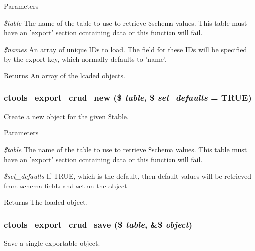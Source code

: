\begin{DoxyParams}{Parameters}
\item[{\em \$table}]The name of the table to use to retrieve \$schema values. This table must have an 'export' section containing data or this function will fail. \item[{\em \$names}]An array of unique IDs to load. The field for these IDs will be specified by the export key, which normally defaults to 'name'.\end{DoxyParams}
\begin{DoxyReturn}{Returns}
An array of the loaded objects. 
\end{DoxyReturn}
\hypertarget{group__export__crud_gafa3d98363b3c0cd3aa90d2d4e9215fbc}{
\subsubsection[{ctools\_\-export\_\-crud\_\-new}]{\setlength{\rightskip}{0pt plus 5cm}ctools\_\-export\_\-crud\_\-new (\$ {\em table}, \/  \$ {\em set\_\-defaults} = {\ttfamily TRUE})}}
\label{group__export__crud_gafa3d98363b3c0cd3aa90d2d4e9215fbc}
Create a new object for the given \$table.


\begin{DoxyParams}{Parameters}
\item[{\em \$table}]The name of the table to use to retrieve \$schema values. This table must have an 'export' section containing data or this function will fail. \item[{\em \$set\_\-defaults}]If TRUE, which is the default, then default values will be retrieved from schema fields and set on the object.\end{DoxyParams}
\begin{DoxyReturn}{Returns}
The loaded object. 
\end{DoxyReturn}
\hypertarget{group__export__crud_ga026370fc39c98bb82c70f223642044cf}{
\subsubsection[{ctools\_\-export\_\-crud\_\-save}]{\setlength{\rightskip}{0pt plus 5cm}ctools\_\-export\_\-crud\_\-save (\$ {\em table}, \/  \&\$ {\em object})}}
\label{group__export__crud_ga026370fc39c98bb82c70f223642044cf}
Save a single exportable object.


